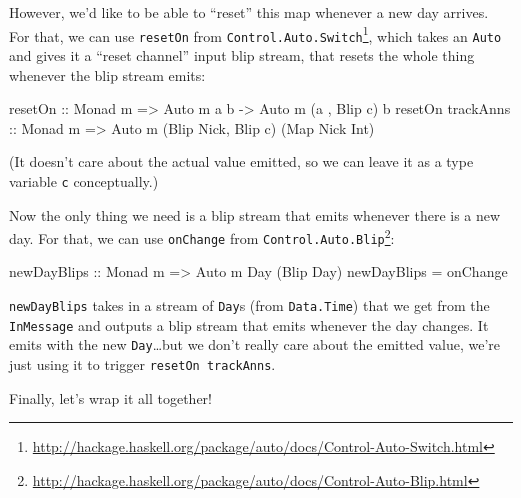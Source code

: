 \documentclass[]{article}
\newenvironment{Shaded}{}{}
\newcommand{\DataTypeTok}[1]{\textcolor[rgb]{0.56,0.13,0.00}{#1}}
\newcommand{\NormalTok}[1]{#1}
\newcommand{\OtherTok}[1]{\textcolor[rgb]{0.00,0.44,0.13}{#1}}
\renewcommand{\href}[2]{#2\footnote{\url{#1}}}
\begin{document}
However, we'd like to be able to ``reset'' this map whenever a new day arrives.
For that, we can use \texttt{resetOn} from
\href{http://hackage.haskell.org/package/auto/docs/Control-Auto-Switch.html}{\texttt{Control.Auto.Switch}},
which takes an \texttt{Auto} and gives it a ``reset channel'' input blip stream,
that resets the whole thing whenever the blip stream emits:

\begin{Shaded}
\begin{Highlighting}[]
\OtherTok{resetOn ::} \DataTypeTok{Monad}\NormalTok{ m }\OtherTok{=\textgreater{}} \DataTypeTok{Auto}\NormalTok{ m a b }\OtherTok{{-}\textgreater{}} \DataTypeTok{Auto}\NormalTok{ m (a        , }\DataTypeTok{Blip}\NormalTok{ c) b}
\NormalTok{resetOn}\OtherTok{ trackAnns ::} \DataTypeTok{Monad}\NormalTok{ m }\OtherTok{=\textgreater{}}     \DataTypeTok{Auto}\NormalTok{ m (}\DataTypeTok{Blip} \DataTypeTok{Nick}\NormalTok{, }\DataTypeTok{Blip}\NormalTok{ c) (}\DataTypeTok{Map} \DataTypeTok{Nick} \DataTypeTok{Int}\NormalTok{)}
\end{Highlighting}
\end{Shaded}

(It doesn't care about the actual value emitted, so we can leave it as a type
variable \texttt{c} conceptually.)

Now the only thing we need is a blip stream that emits whenever there is a new
day. For that, we can use \texttt{onChange} from
\href{http://hackage.haskell.org/package/auto/docs/Control-Auto-Blip.html}{\texttt{Control.Auto.Blip}}:

\begin{Shaded}
\begin{Highlighting}[]
\OtherTok{newDayBlips ::} \DataTypeTok{Monad}\NormalTok{ m }\OtherTok{=\textgreater{}} \DataTypeTok{Auto}\NormalTok{ m }\DataTypeTok{Day}\NormalTok{ (}\DataTypeTok{Blip} \DataTypeTok{Day}\NormalTok{)}
\NormalTok{newDayBlips }\OtherTok{=}\NormalTok{ onChange}
\end{Highlighting}
\end{Shaded}

\texttt{newDayBlips} takes in a stream of \texttt{Day}s (from
\texttt{Data.Time}) that we get from the \texttt{InMessage} and outputs a blip
stream that emits whenever the day changes. It emits with the new
\texttt{Day}\ldots but we don't really care about the emitted value, we're just
using it to trigger \texttt{resetOn\ trackAnns}.

Finally, let's wrap it all together!
\end{document}
